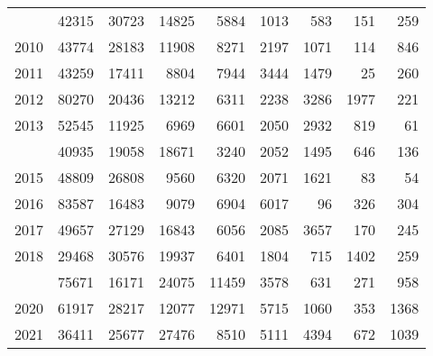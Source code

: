 \documentclass[
]{article}
\begin{document}
\begin{longtable}[t]{lrrrrrrrr}
\addlinespace
2009 & 42315 & 30723 & 14825 & 5884 & 1013 & 583 & 151 & 259\\
2010 & 43774 & 28183 & 11908 & 8271 & 2197 & 1071 & 114 & 846\\
2011 & 43259 & 17411 & 8804 & 7944 & 3444 & 1479 & 25 & 260\\
2012 & 80270 & 20436 & 13212 & 6311 & 2238 & 3286 & 1977 & 221\\
2013 & 52545 & 11925 & 6969 & 6601 & 2050 & 2932 & 819 & 61\\
\addlinespace
2014 & 40935 & 19058 & 18671 & 3240 & 2052 & 1495 & 646 & 136\\
2015 & 48809 & 26808 & 9560 & 6320 & 2071 & 1621 & 83 & 54\\
2016 & 83587 & 16483 & 9079 & 6904 & 6017 & 96 & 326 & 304\\
2017 & 49657 & 27129 & 16843 & 6056 & 2085 & 3657 & 170 & 245\\
2018 & 29468 & 30576 & 19937 & 6401 & 1804 & 715 & 1402 & 259\\
\addlinespace
2019 & 75671 & 16171 & 24075 & 11459 & 3578 & 631 & 271 & 958\\
2020 & 61917 & 28217 & 12077 & 12971 & 5715 & 1060 & 353 & 1368\\
2021 & 36411 & 25677 & 27476 & 8510 & 5111 & 4394 & 672 & 1039\\*
\end{longtable}
\end{document}
